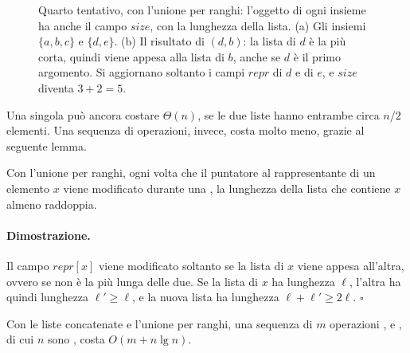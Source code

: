\begin{figure}[htbp]
\caption{Quarto tentativo, con l'unione per ranghi: l'oggetto di ogni insieme ha anche il campo $\mathit{size}$, con la lunghezza della lista. (a) Gli insiemi $\{a,b,c\}$ e $\{d,e\}$. (b) Il risultato di \Union$(d,b)$: la lista di $d$ è la più corta, quindi viene appesa alla lista di $b$, anche se $d$ è il primo argomento. Si aggiornano soltanto i campi $\mathit{repr}$ di $d$ e di $e$, e $\mathit{size}$ diventa $3 + 2 = 5$.}
\label{fig:uf-ranghi}
\end{figure}

Una singola \Union{} può ancora costare $\Theta(n)$, se le due liste hanno entrambe circa $n/2$ elementi. Una sequenza di operazioni, invece, costa molto meno, grazie al seguente lemma.

\begin{lemma}\label{lem:uf-raddoppio}
Con l'unione per ranghi, ogni volta che il puntatore al rappresentante di un elemento $x$ viene modificato durante una \Union{}, la lunghezza della lista che contiene $x$ almeno raddoppia.
\end{lemma}

\paragraph{Dimostrazione.}
Il campo $\mathit{repr}[x]$ viene modificato soltanto se la lista di $x$ viene appesa all'altra, ovvero se non è la più lunga delle due. Se la lista di $x$ ha lunghezza $\ell$, l'altra ha quindi lunghezza $\ell' \ge \ell$, e la nuova lista ha lunghezza $\ell + \ell' \ge 2\ell$. \hfill $\square$

\begin{teorema}\label{teo:uf-liste}
Con le liste concatenate e l'unione per ranghi, una sequenza di $m$ operazioni \MakeSet{}, \Union{} e \FindSet{}, di cui $n$ sono \MakeSet{}, costa $O(m + n \lg n)$.
\end{teorema}

